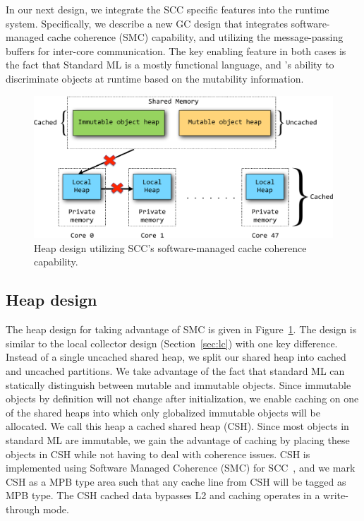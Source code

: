 In our next \MMSCC design, we integrate the SCC specific features into the
runtime system. Specifically, we describe a new GC design that integrates
software-managed cache coherence (SMC) capability, and utilizing the
message-passing buffers for inter-core communication. The key enabling feature
in both cases is the fact that Standard ML is a mostly functional language, and
\MM's ability to discriminate objects at runtime based on the mutability
information.

\begin{figure}
\centering
\includegraphics[width=1\textwidth]{Figures/SMC_Collector.pdf}
\caption{Heap design utilizing SCC's software-managed cache coherence capability.}
\label{fig:smc}
\end{figure}

\subsection{Heap design}

The heap design for taking advantage of SMC is given in Figure~\ref{fig:smc}.
The design is similar to the local collector design (Section~\ref{sec:lc}) with
one key difference.  Instead of a single uncached shared heap, we split our
shared heap into cached and uncached partitions. We take advantage of the fact
that standard ML can statically distinguish between mutable and immutable
objects. Since immutable objects by definition will not change after
initialization, we enable caching on one of the shared heaps into which only
globalized immutable objects will be allocated. We call this heap a cached
shared heap (CSH). Since most objects in standard ML are immutable, we gain the
advantage of caching by placing these objects in CSH while not having to deal
with coherence issues. CSH is implemented using Software Managed Coherence
(SMC) for SCC~\cite{SMC}, and we mark CSH as a MPB type area such that any
cache line from CSH will be tagged as MPB type. The CSH cached data bypasses L2
and caching operates in a write-through mode.

